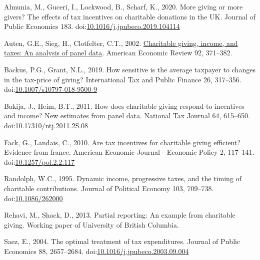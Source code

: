 \documentclass[
  11pt,
  a4paper,
]{article}
\newlength{\cslhangindent}
\newlength{\cslentryspacingunit} %
\newenvironment{CSLReferences}[2] %
 {%
  \setlength{\parindent}{0pt}
  \ifodd #1
  \let\oldpar\par
  \def\par{\hangindent=\cslhangindent\oldpar}
  \fi
  \setlength{\parskip}{#2\cslentryspacingunit}
 }%
 {}
\begin{document}
\hypertarget{refs}{}
\begin{CSLReferences}{1}{0}
\leavevmode{}%
Almunia, M., Guceri, I., Lockwood, B., Scharf, K., 2020. More giving or more givers? The effects of tax incentives on charitable donations in the UK. Journal of Public Economics 183. doi:\href{https://doi.org/10.1016/j.jpubeco.2019.104114}{10.1016/j.jpubeco.2019.104114}

\leavevmode{}%
Auten, G.E., Sieg, H., Clotfelter, C.T., 2002. \href{http://www.jstor.org/stable/3083340}{Charitable giving, income, and taxes: An analysis of panel data}. American Economic Review 92, 371--382.

\leavevmode{}%
Backus, P.G., Grant, N.L., 2019. How sensitive is the average taxpayer to changes in the tax-price of giving? International Tax and Public Finance 26, 317--356. doi:\href{https://doi.org/10.1007/s10797-018-9500-9}{10.1007/s10797-018-9500-9}

\leavevmode{}%
Bakija, J., Heim, B.T., 2011. How does charitable giving respond to incentives and income? New estimates from panel data. National Tax Journal 64, 615--650. doi:\href{https://doi.org/10.17310/ntj.2011.2S.08}{10.17310/ntj.2011.2S.08}

\leavevmode{}%
Fack, G., Landais, C., 2010. Are tax incentives for charitable giving efficient? Evidence from france. American Economic Journal - Economic Policy 2, 117--141. doi:\href{https://doi.org/10.1257/pol.2.2.117}{10.1257/pol.2.2.117}

\leavevmode{}%
Randolph, W.C., 1995. Dynamic income, progressive taxes, and the timing of charitable contributions. Journal of Political Economy 103, 709--738. doi:\href{https://doi.org/10.1086/262000}{10.1086/262000}

\leavevmode{}%
Rehavi, M., Shack, D., 2013. Partial reporting: An example from charitable giving. Working paper of University of British Columbia.

\leavevmode{}%
Saez, E., 2004. The optimal treatment of tax expenditures. Journal of Public Economics 88, 2657--2684. doi:\href{https://doi.org/10.1016/j.jpubeco.2003.09.004}{10.1016/j.jpubeco.2003.09.004}

\end{CSLReferences}
\end{document}

